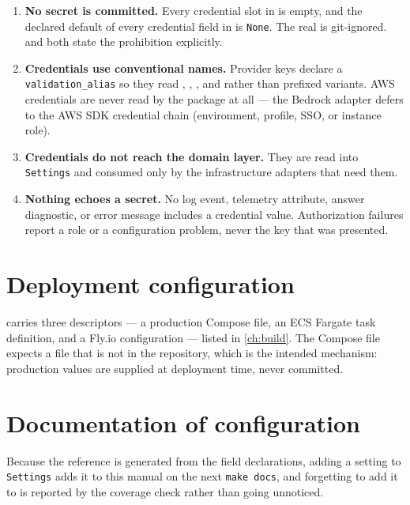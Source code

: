 \begin{enumerate}
  \item \textbf{No secret is committed.} Every credential slot in
     is empty, and the declared default of every
    credential field in  is \texttt{None}. The real
     is git-ignored.  and
     both state the prohibition explicitly.
  \item \textbf{Credentials use conventional names.} Provider keys declare a
    \texttt{validation\_alias} so they read ,
    , , and
     rather than prefixed variants. AWS credentials
    are never read by the package at all --- the Bedrock adapter defers to the
    AWS SDK credential chain (environment, profile, SSO, or instance role).
  \item \textbf{Credentials do not reach the domain layer.} They are read into
    \texttt{Settings} and consumed only by the infrastructure adapters that
    need them.
  \item \textbf{Nothing echoes a secret.} No log event, telemetry attribute,
    answer diagnostic, or error message includes a credential value.
    Authorization failures report a role or a configuration problem, never the
    key that was presented.
\end{enumerate}

\section{Deployment configuration}

 carries three descriptors --- a production Compose file, an
ECS Fargate task definition, and a Fly.io configuration --- listed in
\cref{ch:build}. The Compose file expects a  file
that is not in the repository, which is the intended mechanism: production
values are supplied at deployment time, never committed.

\section{Documentation of configuration}

Because the reference is generated from the field declarations, adding a
setting to \texttt{Settings} adds it to this manual on the next
\texttt{make docs}, and forgetting to add it to  is
reported by the coverage check rather than going unnoticed.
